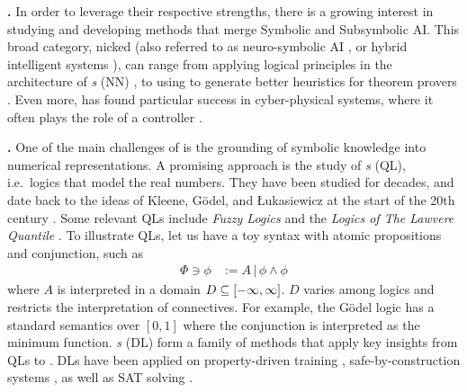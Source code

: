 \textbf{\InAI{}.} In order to leverage their respective strengths, there is a growing interest in studying and developing methods that merge Symbolic and Subsymbolic AI. This broad category, nicked \emph{\InAI{}}  \citep{Platzer_2024} (also referred to as neuro-symbolic AI \citep{d2009neural}, or hybrid intelligent systems \citep{medsker2012hybrid}), can range from applying logical principles in the architecture of \emph{ \NN{}s} (NN)  \citep{badreddine2022logic, petersen2022deep}, to using \SuAI{} to generate better heuristics for theorem provers \citep{laurent2022learning}. Even more, \InAI{} has found particular success in cyber-physical systems, where it often plays the role of a controller \citep{Platzer_2024}.

\textbf{\DL{}.} One of the main challenges of \InAI{} is the grounding of symbolic knowledge into numerical representations. A promising approach is the study of \emph{\QL{}s} (QL), i.e.~logics that model the real numbers. They have been studied for decades, and date back to the ideas of Kleene, G\"{o}del, and Łukasiewicz at the start of the 20th century \citep{cintula2011handbook, prooffuzzy}. Some relevant QLs include \emph{Fuzzy Logics} \citep{cintula2011handbook} and the \emph{Logics of The Lawvere Quantile} \citep{bacci2024polynomial, bacci2023propositional, capucci2024quantifiers, bacci2025induction}. To illustrate QLs, let us have a toy syntax with atomic propositions and conjunction, such as
\begin{equation}
\begin{split}
    \Phi \ni \phi &:= A \,|\, \phi \land \phi
\end{split}
\end{equation}
where $A$ is interpreted in a domain $D \subseteq [-\infty,\infty]$. $D$ varies among logics and restricts the interpretation of connectives. For example, the
G\"{o}del logic \citep{BAAZ200723} has a standard semantics over $[0, 1]$ where the conjunction is interpreted as the minimum function. \emph{\DL{}s} (DL) form a family of methods that apply key insights from QLs to \InAI{}. DLs have been applied on property-driven training \citep{FLINKOW2025103280}, safe-by-construction systems \citep{badreddine2022logic}, as well as SAT solving \citep{kyrillidis2021continuous, gaglione2022maxsat}. 

